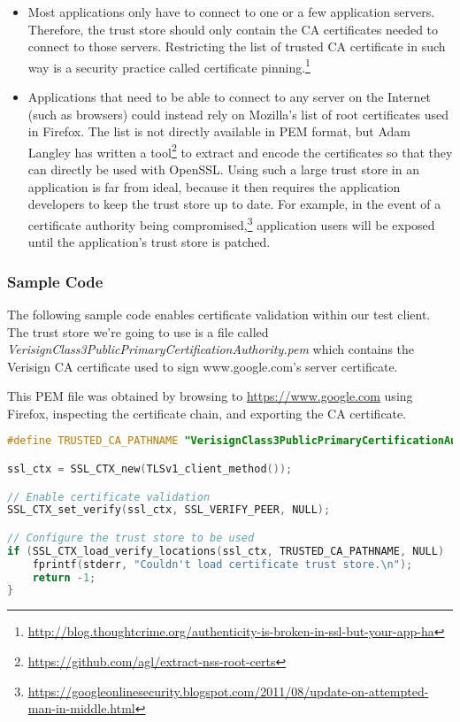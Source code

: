 \documentclass{article}
\begin{document}
\begin{itemize}

    \item Most applications only have to connect to one or a
        few application servers. Therefore, the trust store should
        only contain the CA certificates needed to connect to those
        servers. Restricting the list of trusted CA certificate
        in such way is a security practice called certificate
        pinning.\footnote{\url{http://blog.thoughtcrime.org/authenticity-is-broken-in-ssl-but-your-app-ha}}

    \item Applications that need to be able to connect to any server
        on the Internet (such as browsers) could instead rely on Mozilla's
        list of root certificates used in Firefox. The list is
        not directly available in PEM format, but Adam Langley has written a
        tool\footnote{\url{https://github.com/agl/extract-nss-root-certs}}
        to extract and encode the certificates so that they can directly
        be used with OpenSSL. Using such a large trust store in an
        application is far from ideal, because it then requires the
        application developers to keep the trust store up to date.
        For example, in the event of a certificate authority being
        compromised,\footnote{\url{https://googleonlinesecurity.blogspot.com/2011/08/update-on-attempted-man-in-middle.html}}
        application users will be exposed until the application's trust store is
        patched.

\end{itemize}

\subsubsection{Sample Code}

The following sample code enables certificate validation within our test
client. The trust store we're going to use is a file called 
{\em VerisignClass3PublicPrimaryCertificationAuthority.pem} which contains the
Verisign CA certificate used to sign www.google.com's server certificate.

This PEM file was obtained by browsing to \url{https://www.google.com} using
Firefox, inspecting the certificate chain, and exporting the CA certificate.

\begin{lstlisting}[style=code,language=C,numbers=none,caption={}]
#define TRUSTED_CA_PATHNAME "VerisignClass3PublicPrimaryCertificationAuthority.pem"

ssl_ctx = SSL_CTX_new(TLSv1_client_method());

// Enable certificate validation 
SSL_CTX_set_verify(ssl_ctx, SSL_VERIFY_PEER, NULL);

// Configure the trust store to be used
if (SSL_CTX_load_verify_locations(ssl_ctx, TRUSTED_CA_PATHNAME, NULL) != 1){
	fprintf(stderr, "Couldn't load certificate trust store.\n");
	return -1;
}
\end{lstlisting}
\end{document}
